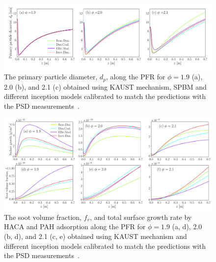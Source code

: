 \begin{figure}[H]
	\centering
	\includegraphics[width=1\textwidth]{Figures/Results/PSR/d_p_eq_ratio_all_single_mech.pdf}
	\caption{The primary particle diameter, $d_p$, along the PFR for $\phi=1.9$ (a), 2.0 (b), and 2.1 (c) obtained using KAUST mechanism, SPBM and different inception models calibrated to match the predictions with the PSD measurements~\citep{manzello2007soot}.}
	\label{fig:psrpfr_dp} 
\end{figure}

\begin{figure}[H]
	\centering
	\includegraphics[width=1\textwidth]{Figures/Results/PSR/surface_growth_fv.pdf}
	\caption{The soot volume fraction, $f_v$, and total surface growth rate by HACA and PAH adsorption along the PFR for $\phi=1.9$ (a, d), 2.0 (b, d), and 2.1 (c, e) obtained using KAUST mechanism and different inception models calibrated to match the predictions with the PSD measurements~\citep{manzello2007soot}.}
	\label{fig:psrpfr_fv} 
\end{figure}


